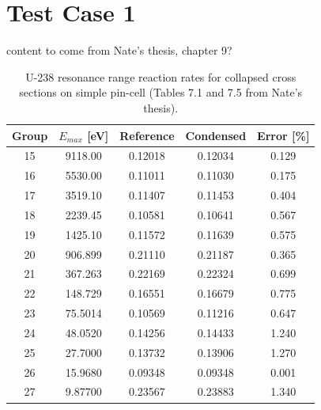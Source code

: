 \section{Test Case 1}
\label{sec:test-case1}

{\color{red} content to come from Nate's thesis, chapter 9?}

\begin{table}[h!]
  \centering
  \caption{U-238 resonance range reaction rates for collapsed cross sections on simple pin-cell {(\color{red}Tables 7.1 and 7.5 from Nate's thesis)}.}
  \label{tab:case1-bias} 
  \begin{tabular}{c c c c c}
  \toprule
  Group & $E_{max}$ [eV] & Reference & Condensed & Error [\%] \\
  \midrule
  15 & 9118.00 & 0.12018 & 0.12034 & 0.129 \\
  16 & 5530.00 & 0.11011 & 0.11030 & 0.175 \\
  17 & 3519.10 & 0.11407 & 0.11453 & 0.404 \\
  18 & 2239.45 & 0.10581 & 0.10641 & 0.567 \\
  19 & 1425.10 & 0.11572 & 0.11639 & 0.575 \\
  20 & 906.899 & 0.21110 & 0.21187 & 0.365 \\
  21 & 367.263 & 0.22169 & 0.22324 & 0.699 \\
  22 & 148.729 & 0.16551 & 0.16679 & 0.775 \\
  23 & 75.5014 & 0.10569 & 0.11216 & 0.647 \\
  24 & 48.0520 & 0.14256 & 0.14433 & 1.240 \\
  25 & 27.7000 & 0.13732 & 0.13906 & 1.270 \\
  26 & 15.9680 & 0.09348 & 0.09348 & 0.001 \\
  27 & 9.87700 & 0.23567 & 0.23883 & 1.340 \\
  \bottomrule
\end{tabular}
\end{table}

